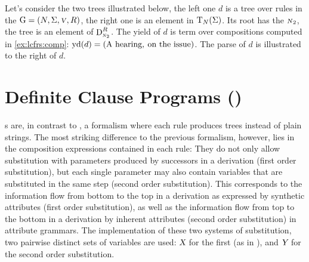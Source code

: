 \documentclass[../document.tex]{subfiles}
\begin{document}
    \begin{example}\label{ex:lcfrs:deriv}
        Let's consider the two trees illustrated below, the left one \(d\) is a tree over rules in the  \(\mathrm{G} = (N, \Sigma, \textsc{\textsl{v}}, R)\), the right one is an element in \(\operatorname{T}_N(\Sigma)\).
        Its root has the  \(\textsc{\textsl{n}}_2\), the tree is an element of \(\operatorname{D}^R_{\textsc{\textsl{n}}_2}\).
        The yield of \(d\) is term over compositions computed in \cref{ex:lcfrs:comp}: \(\operatorname{yd}(d) = (\text{A hearing}, \: \text{on the issue})\).
        The parse of \(d\) is illustrated to the right of \(d\).

        \null\hfill
        \hfill
        \hfill\null
    \end{example}


    \section{Definite Clause Programs ()}
    s are, in contrast to , a formalism where each rule produces trees instead of plain strings.
    The most striking difference to the previous formalism, however, lies in the composition expressions contained in each rule:
        They do not only allow substitution with parameters produced by successors in a derivation (first order substitution), but each single parameter may also contain variables that are substituted in the same step (second order substitution).
    This corresponds to the information flow from bottom to the top in a derivation as expressed by synthetic attributes (first order substitution), as well as the information flow from top to the bottom in a derivation by inherent attributes (second order substitution) in attribute grammars.
    The implementation of these two systems of substitution, two pairwise distinct sets of variables are used: \(\textsl{X}\) for the first (as in ), and \(\textsl{Y}\) for the second order substitution.
\end{document}
